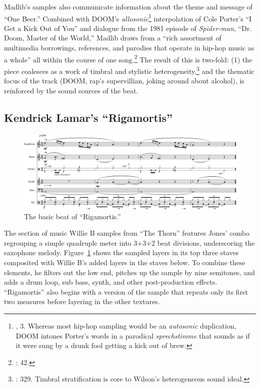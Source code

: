 Madlib's samples also communicate information about the theme and message of ``One Beer.'' Combined with DOOM's \emph{allosonic}\footnote{\cite{justinawilliamsRhyminStealinMusical2013}, 3. Whereas most hip-hop sampling would be an \emph{autosonic} duplication, DOOM intones Porter's words in a parodical \textit{sprechstimme} that sounds as if it were sung by a drunk fool getting a kick out of brew.} interpolation of Cole Porter's ``I Get a Kick Out of You'' and dialogue from the 1981 episode of \textit{Spider-man}, ``Dr. Doom, Master of the World,'' Madlib draws from a ``rich assortment of multimedia borrowings, references, and parodies that operate in hip-hop music as a whole'' all within the course of one song.\footnote{\cite{joannademersSampling1970sHipHop2003}: 42.} The result of this is two-fold: (1) the piece coalesces as a work of timbral and stylistic heterogeneity,\footnote{\cite{ollywilsonHeterogeneousSoundIdeal1992}: 329. Timbral stratification is core to Wilson's heterogeneous sound ideal.} and the thematic focus of the track (DOOM, rap's supervillian, joking around about alcohol), is reinforced by the sound sources of the beat.

\subsection*{\centering Kendrick Lamar's ``Rigamortis''}

\begin{figure}[h]
    \centering
    \includegraphics[width=\textwidth]{images/figures/chp 02/Figure-02.3-Rigamortis-BB.pdf}
    \caption{The basic beat of ``Rigamortis.''}
    \label{fig:2.1}
\end{figure}

The section of music Willie B samples from ``The Thorn'' features Jones' combo regrouping a simple quadruple meter into 3+3+2 beat divisions, underscoring the saxophone melody. Figure~\ref{fig:2.1} shows the sampled layers in its top three staves composited with Willie B's added layers in the staves below. To combine these elements, he filters out the low end, pitches up the sample by nine semitones, and adds a drum loop, sub bass, synth, and other post-production effects. ``Rigamortis'' also begins with a version of the sample that repeats only its first two measures before layering in the other textures.

